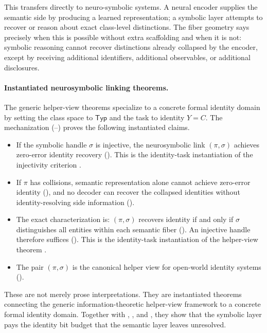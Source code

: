This transfers directly to neuro-symbolic systems. A neural encoder supplies the semantic side by producing a learned representation; a symbolic layer attempts to recover or reason about exact class-level distinctions. The fiber geometry says precisely when this is possible without extra scaffolding and when it is not: symbolic reasoning cannot recover distinctions already collapsed by the encoder, except by receiving additional identifiers, additional observables, or additional disclosures.

\paragraph{Instantiated neurosymbolic linking theorems.}
The generic helper-view theorems specialize to a concrete formal identity domain by setting the class space to $\mathsf{Typ}$ and the task to identity $Y = C$. The mechanization (--) proves the following instantiated claims.

\begin{itemize}
\item If the symbolic handle $\sigma$ is injective, the neurosymbolic link $(\pi, \sigma)$ achieves zero-error identity recovery (). This is the identity-task instantiation of the injectivity criterion .

\item If $\pi$ has collisions, semantic representation alone cannot achieve zero-error identity (), and no decoder can recover the collapsed identities without identity-resolving side information ().

\item The exact characterization is: $(\pi, \sigma)$ recovers identity if and only if $\sigma$ distinguishes all entities within each semantic fiber (). An injective handle therefore suffices (). This is the identity-task instantiation of the helper-view theorem .

\item The pair $(\pi, \sigma)$ is the canonical helper view for open-world identity systems ().
\end{itemize}

These are not merely prose interpretations. They are instantiated theorems connecting the generic information-theoretic helper-view framework to a concrete formal identity domain. Together with , , and , they show that the symbolic layer pays the identity bit budget that the semantic layer leaves unresolved.

